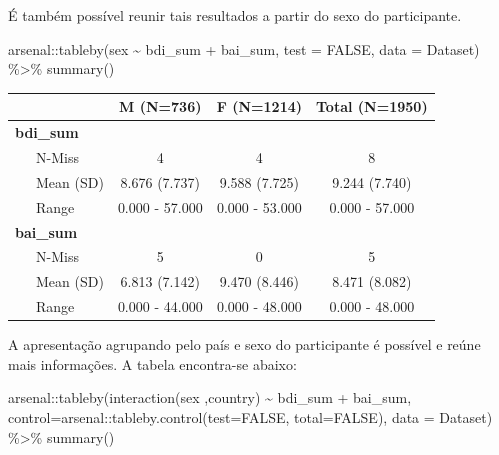 \documentclass[
]{book}
\newenvironment{Shaded}{\begin{snugshade}}{\end{snugshade}}
\newcommand{\AttributeTok}[1]{\textcolor[rgb]{0.77,0.63,0.00}{#1}}
\newcommand{\ConstantTok}[1]{\textcolor[rgb]{0.00,0.00,0.00}{#1}}
\newcommand{\FunctionTok}[1]{\textcolor[rgb]{0.00,0.00,0.00}{#1}}
\newcommand{\NormalTok}[1]{#1}
\newcommand{\SpecialCharTok}[1]{\textcolor[rgb]{0.00,0.00,0.00}{#1}}
\begin{document}
É também possível reunir tais resultados a partir do sexo do participante.

\begin{Shaded}
\begin{Highlighting}[]
\NormalTok{arsenal}\SpecialCharTok{::}\FunctionTok{tableby}\NormalTok{(sex }\SpecialCharTok{\textasciitilde{}}\NormalTok{ bdi\_sum }\SpecialCharTok{+}\NormalTok{ bai\_sum, }
                 \AttributeTok{test =} \ConstantTok{FALSE}\NormalTok{, }
                 \AttributeTok{data =}\NormalTok{ Dataset) }\SpecialCharTok{\%\textgreater{}\%}
  \FunctionTok{summary}\NormalTok{()}
\end{Highlighting}
\end{Shaded}

\begin{longtable}[]{@{}lccc@{}}
\toprule
& M (N=736) & F (N=1214) & Total (N=1950) \\
\midrule
\endhead
\textbf{bdi\_sum} & & & \\
~~~N-Miss & 4 & 4 & 8 \\
~~~Mean (SD) & 8.676 (7.737) & 9.588 (7.725) & 9.244 (7.740) \\
~~~Range & 0.000 - 57.000 & 0.000 - 53.000 & 0.000 - 57.000 \\
\textbf{bai\_sum} & & & \\
~~~N-Miss & 5 & 0 & 5 \\
~~~Mean (SD) & 6.813 (7.142) & 9.470 (8.446) & 8.471 (8.082) \\
~~~Range & 0.000 - 44.000 & 0.000 - 48.000 & 0.000 - 48.000 \\
\bottomrule
\end{longtable}

A apresentação agrupando pelo país e sexo do participante é possível e reúne mais informações. A tabela encontra-se abaixo:

\begin{Shaded}
\begin{Highlighting}[]
\NormalTok{arsenal}\SpecialCharTok{::}\FunctionTok{tableby}\NormalTok{(}\FunctionTok{interaction}\NormalTok{(sex ,country) }\SpecialCharTok{\textasciitilde{}}\NormalTok{ bdi\_sum }\SpecialCharTok{+}\NormalTok{ bai\_sum, }
                 \AttributeTok{control=}\NormalTok{arsenal}\SpecialCharTok{::}\FunctionTok{tableby.control}\NormalTok{(}\AttributeTok{test=}\ConstantTok{FALSE}\NormalTok{, }
                                                  \AttributeTok{total=}\ConstantTok{FALSE}\NormalTok{),}
                 \AttributeTok{data =}\NormalTok{ Dataset) }\SpecialCharTok{\%\textgreater{}\%}
  \FunctionTok{summary}\NormalTok{()}
\end{Highlighting}
\end{Shaded}
\end{document}
